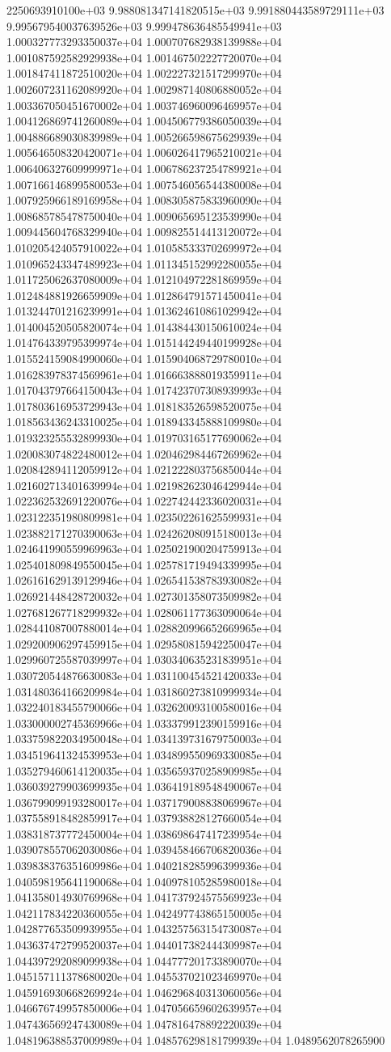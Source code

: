2250693910100e+03	9.988081347141820515e+03	9.991880443589729111e+03	9.995679540037639526e+03	9.999478636485549941e+03	1.000327773293350037e+04	1.000707682938139988e+04	1.001087592582929938e+04	1.001467502227720070e+04	1.001847411872510020e+04	1.002227321517299970e+04	1.002607231162089920e+04	1.002987140806880052e+04	1.003367050451670002e+04	1.003746960096469957e+04	1.004126869741260089e+04	1.004506779386050039e+04	1.004886689030839989e+04	1.005266598675629939e+04	1.005646508320420071e+04	1.006026417965210021e+04	1.006406327609999971e+04	1.006786237254789921e+04	1.007166146899580053e+04	1.007546056544380008e+04	1.007925966189169958e+04	1.008305875833960090e+04	1.008685785478750040e+04	1.009065695123539990e+04	1.009445604768329940e+04	1.009825514413120072e+04	1.010205424057910022e+04	1.010585333702699972e+04	1.010965243347489923e+04	1.011345152992280055e+04	1.011725062637080009e+04	1.012104972281869959e+04	1.012484881926659909e+04	1.012864791571450041e+04	1.013244701216239991e+04	1.013624610861029942e+04	1.014004520505820074e+04	1.014384430150610024e+04	1.014764339795399974e+04	1.015144249440199928e+04	1.015524159084990060e+04	1.015904068729780010e+04	1.016283978374569961e+04	1.016663888019359911e+04	1.017043797664150043e+04	1.017423707308939993e+04	1.017803616953729943e+04	1.018183526598520075e+04	1.018563436243310025e+04	1.018943345888109980e+04	1.019323255532899930e+04	1.019703165177690062e+04	1.020083074822480012e+04	1.020462984467269962e+04	1.020842894112059912e+04	1.021222803756850044e+04	1.021602713401639994e+04	1.021982623046429944e+04	1.022362532691220076e+04	1.022742442336020031e+04	1.023122351980809981e+04	1.023502261625599931e+04	1.023882171270390063e+04	1.024262080915180013e+04	1.024641990559969963e+04	1.025021900204759913e+04	1.025401809849550045e+04	1.025781719494339995e+04	1.026161629139129946e+04	1.026541538783930082e+04	1.026921448428720032e+04	1.027301358073509982e+04	1.027681267718299932e+04	1.028061177363090064e+04	1.028441087007880014e+04	1.028820996652669965e+04	1.029200906297459915e+04	1.029580815942250047e+04	1.029960725587039997e+04	1.030340635231839951e+04	1.030720544876630083e+04	1.031100454521420033e+04	1.031480364166209984e+04	1.031860273810999934e+04	1.032240183455790066e+04	1.032620093100580016e+04	1.033000002745369966e+04	1.033379912390159916e+04	1.033759822034950048e+04	1.034139731679750003e+04	1.034519641324539953e+04	1.034899550969330085e+04	1.035279460614120035e+04	1.035659370258909985e+04	1.036039279903699935e+04	1.036419189548490067e+04	1.036799099193280017e+04	1.037179008838069967e+04	1.037558918482859917e+04	1.037938828127660054e+04	1.038318737772450004e+04	1.038698647417239954e+04	1.039078557062030086e+04	1.039458466706820036e+04	1.039838376351609986e+04	1.040218285996399936e+04	1.040598195641190068e+04	1.040978105285980018e+04	1.041358014930769968e+04	1.041737924575569923e+04	1.042117834220360055e+04	1.042497743865150005e+04	1.042877653509939955e+04	1.043257563154730087e+04	1.043637472799520037e+04	1.044017382444309987e+04	1.044397292089099938e+04	1.044777201733890070e+04	1.045157111378680020e+04	1.045537021023469970e+04	1.045916930668269924e+04	1.046296840313060056e+04	1.046676749957850006e+04	1.047056659602639957e+04	1.047436569247430089e+04	1.047816478892220039e+04	1.048196388537009989e+04	1.048576298181799939e+04	1.0489562078265900